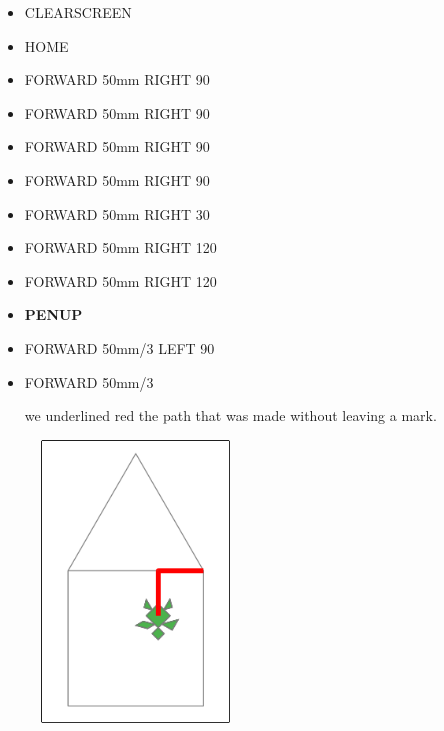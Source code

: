 \begin{scriptsize}
\begin{minipage}{0.40\textwidth}
\begin{itemize}[itemsep=-3pt,parsep=2pt]
\item[] CLEARSCREEN             
\item[] HOME
\item[] FORWARD 50mm RIGHT 90
\item[] FORWARD 50mm RIGHT 90
\item[] FORWARD 50mm RIGHT 90
\item[] FORWARD 50mm RIGHT 90
\item[] FORWARD 50mm RIGHT 30
\item[] FORWARD 50mm RIGHT 120
\item[] FORWARD 50mm RIGHT 120
\item[] \textbf{PENUP}
\item[] FORWARD 50mm/3 LEFT 90
\item[] FORWARD 50mm/3

we underlined red the path that was made without leaving a mark. 

\end{itemize}
\end{minipage}
\end{scriptsize}
\begin{minipage}{0.4\textwidth}
\begin{figure}[H]
   \includegraphics[width=5.0cm,trim=4 4 8 4,clip]{./images/disegnare/disegnare-8.png}
   \label{dis-8}
\end{figure}
\end{minipage} \hfill

\vskip 1cm

